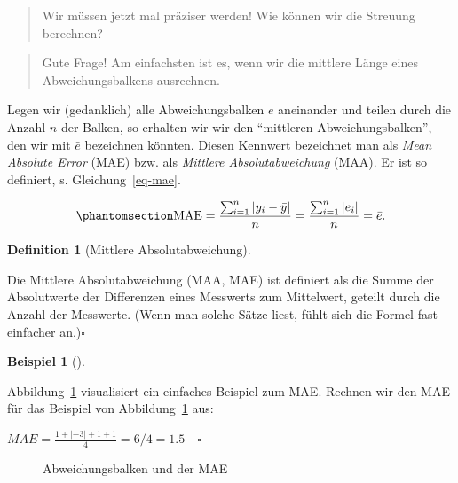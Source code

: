 \documentclass[
  letterpaper,
]{scrbook}
\theoremstyle{definition}
\newtheorem{example}{Beispiel}[chapter]
\theoremstyle{definition}
\newtheorem{definition}{Definition}[chapter]
\theoremstyle{definition}
\theoremstyle{remark}
\begin{document}
\begin{quote}
{} Wir müssen jetzt mal präziser werden! Wie können wir
die Streuung berechnen?
\end{quote}

\begin{quote}
{} Gute Frage! Am einfachsten ist es, wenn wir die
mittlere Länge eines Abweichungsbalkens ausrechnen.
\end{quote}

Legen wir (gedanklich) alle Abweichungsbalken \(e\) aneinander und
teilen durch die Anzahl \(n\) der Balken, so erhalten wir wir den
``mittleren Abweichungsbalken'', den wir mit \(\bar{e}\) bezeichnen
könnten. Diesen Kennwert bezeichnet man als \emph{Mean Absolute Error}
(MAE) bzw. als \emph{Mittlere Absolutabweichung} (MAA). Er ist so
definiert, s. Gleichung~\ref{eq-mae}.

\begin{equation}\phantomsection\label{eq-mae}{{\displaystyle \mathrm {MAE} ={\frac {\sum _{i=1}^{n}\left|y_{i}-\bar{y}\right|}{n}}={\frac {\sum _{i=1}^{n}\left|e_{i}\right|}{n}}=\bar{e}.}}\end{equation}

\begin{definition}[Mittlere
Absolutabweichung]\protect\hypertarget{def-mae}{}\label{def-mae}

Die Mittlere Absolutabweichung (MAA, MAE) ist definiert als die Summe
der Absolutwerte der Differenzen eines Messwerts zum Mittelwert, geteilt
durch die Anzahl der Messwerte. (Wenn man solche Sätze liest, fühlt sich
die Formel fast einfacher an.)\(\square\)

\end{definition}

\begin{example}[]\protect\hypertarget{exm-mae}{}\label{exm-mae}

Abbildung~\ref{fig-mae} visualisiert ein einfaches Beispiel zum MAE.
Rechnen wir den MAE für das Beispiel von Abbildung~\ref{fig-mae} aus:

\(MAE = \frac{1 + |- 3| + 1 + 1}{4} = 6/4 = 1.5 \quad \square\)

\end{example}

\begin{figure}


\caption{\label{fig-mae}Abweichungsbalken und der MAE}

\end{figure}%
\end{document}
